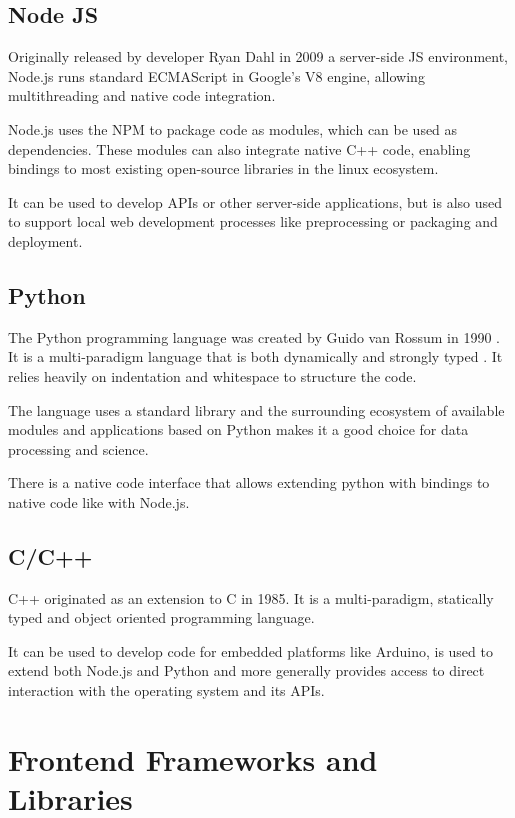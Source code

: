 \subsection{Node JS}

Originally released by developer Ryan Dahl in 2009 a server-side \ac{JS} environment, Node.js runs standard ECMAScript in Google's V8 engine, allowing multithreading and native code integration.

Node.js uses the \ac{NPM} to package code as modules, which can be used as dependencies. These modules can also integrate native C++ code, enabling bindings to most existing open-source libraries in the linux ecosystem.

It can be used to develop \ac{API}s or other server-side applications, but is also used to support local web development processes like preprocessing or packaging and deployment. 

\subsection{Python}

The Python programming language was created by Guido van Rossum in 1990 \parencite{pythonHistory}. It is a multi-paradigm language that is both dynamically and strongly typed \parencite{pythonTyping}. It relies heavily on indentation and whitespace to structure the code.

The language uses a standard library and the surrounding ecosystem of available modules and applications based on Python makes it a good choice for data processing and science.

There is a native code interface that allows extending python with bindings to native code like with Node.js.

\subsection{C/C++}

C++ originated as an extension to C in 1985. It is a multi-paradigm, statically typed and object oriented programming language.

It can be used to develop code for embedded platforms like Arduino, is used to extend both Node.js and Python and more generally provides access to direct interaction with the operating system and its APIs.


\section{Frontend Frameworks and Libraries}

